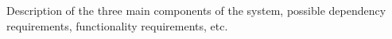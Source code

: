 Description of the three main components of the system, possible dependency requirements, functionality requirements, etc.